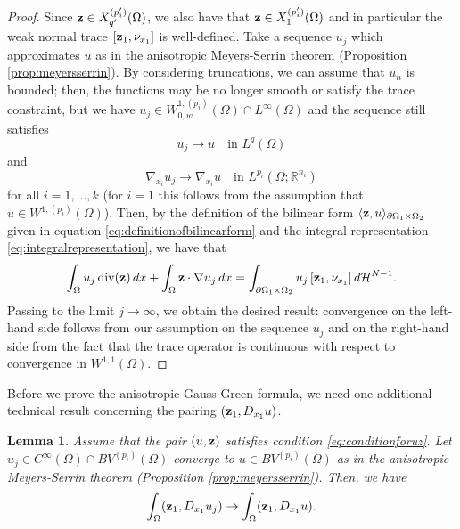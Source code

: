 \documentclass[reqno,12pt]{amsart}
\def\z{{\bf z}}
\newtheorem{lemma}[theorem]{Lemma}
\numberwithin{equation}{section}
\begin{document}
\begin{proof}
Since $\z \in X_{q'}^{(p'_i)}(\Omega)$, we also have that $\z \in X_{1}^{(p'_i)}(\Omega)$ and in particular the weak normal trace $[\z_1, \nu_{x_1}]$ is well-defined. Take a sequence $u_j$ which approximates $u$ as in the anisotropic Meyers-Serrin theorem (Proposition \ref{prop:meyersserrin}). By considering truncations, we can assume that $u_n$ is bounded; then, the functions may be no longer smooth or satisfy the trace constraint, but we have $u_j \in W_{0,w}^{1,(p_i)}(\Omega) \cap L^\infty(\Omega)$ and the sequence still satisfies
$$ u_j \rightarrow u \quad \mbox{in } L^{q}(\Omega)$$ 
and
$$\nabla_{x_i} u_j \rightarrow \nabla_{x_i} u \quad \mbox{in } L^{p_i}(\Omega; \mathbb{R}^{n_i})$$ 
for all $i = 1, ..., k$ (for $i = 1$ this follows from the assumption that $u \in W^{1,(p_i)}(\Omega)$). Then, by the definition of the bilinear form $\langle \z, u \rangle_{\partial\Omega_1 \times \Omega_2}$ given in equation \eqref{eq:definitionofbilinearform} and the integral representation \eqref{eq:integralrepresentation}, we have that
\begin{equation}
\int_{\Omega} u_j \, \mathrm{div}(\z) \, dx + \int_\Omega \z \cdot \nabla u_j \, dx = \int_{\partial\Omega_1 \times \Omega_2} u_j \, [\z_1, \nu_{x_1}] \,d\mathcal{H}^{N-1}.
\end{equation}
Passing to the limit $j \rightarrow \infty$, we obtain the desired result: convergence on the left-hand side follows from our assumption on the sequence $u_j$ and on the right-hand side from the fact that the trace operator is continuous with respect to convergence in $W^{1,1}(\Omega)$.
\end{proof}

Before we prove the anisotropic Gauss-Green formula, we need one additional technical result concerning the pairing $(\z_1, D_{x_1} u)$.

\begin{lemma}\label{lem:approximationofpairing}
Assume that the pair $(u,\z)$ satisfies condition \eqref{eq:conditionforuz}. Let $u_j \in C^\infty(\Omega) \cap BV^{(p_i)}(\Omega)$ converge to $u \in BV^{(p_i)}(\Omega)$ as in the anisotropic Meyers-Serrin theorem (Proposition \ref{prop:meyersserrin}). Then, we have
$$ \int_\Omega (\z_1, D_{x_1} u_j) \rightarrow \int_\Omega (\z_1, D_{x_1} u).$$
\end{lemma}
\end{document}
